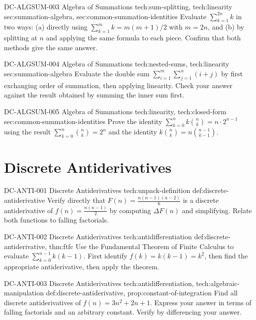 \exstubgenfull
  {DC-ALGSUM-003}
  {Algebra of Summations}
  {tech:sum-splitting, tech:linearity}
  {sec:summation-algebra, sec:common-summation-identities}
  {Evaluate \(\displaystyle\sum_{k=1}^{2n} k\) in two ways:
  (a) directly using \(\sum_{k=1}^{m}k = m(m+1)/2\) with \(m = 2n\), and
  (b) by splitting at \(n\) and applying the same formula to each piece.
  Confirm that both methods give the same answer.}

\exstubgenfull
  {DC-ALGSUM-004}
  {Algebra of Summations}
  {tech:nested-sums, tech:linearity}
  {sec:summation-algebra}
  {Evaluate the double sum
  \(\displaystyle\sum_{i=1}^{m}\sum_{j=1}^{n}(i+j)\)
  by first exchanging order of summation, then applying linearity.
  Check your answer against the result obtained by summing
  the inner sum first.}

\exstubgenfull
  {DC-ALGSUM-005}
  {Algebra of Summations}
  {tech:linearity, tech:closed-form}
  {sec:common-summation-identities}
  {Prove the identity
  \(\displaystyle\sum_{k=0}^{n} k\binom{n}{k} = n\cdot 2^{n-1}\)
  using the result \(\displaystyle\sum_{k=0}^{n}\binom{n}{k} = 2^n\)
  and the identity \(k\binom{n}{k} = n\binom{n-1}{k-1}\).}

\section*{Discrete Antiderivatives}

\exstubgenfull
  {DC-ANTI-001}
  {Discrete Antiderivatives}
  {tech:unpack-definition}
  {def:discrete-antiderivative}
  {Verify directly that \(F(n) = \frac{n(n-1)(n-2)}{6}\) is a discrete
  antiderivative of \(f(n) = \frac{n(n-1)}{2}\) by computing \(\Delta F(n)\)
  and simplifying. Relate both functions to falling factorials.}

\exstubgenfull
  {DC-ANTI-002}
  {Discrete Antiderivatives}
  {tech:antidifferentiation}
  {def:discrete-antiderivative, thm:ftfc}
  {Use the Fundamental Theorem of Finite Calculus to evaluate
  \(\displaystyle\sum_{k=0}^{n-1} k(k-1)\).
  First identify \(f(k) = k(k-1) = k^{\underline{2}}\), then find the
  appropriate antiderivative, then apply the theorem.}

\exstubgenfull
  {DC-ANTI-003}
  {Discrete Antiderivatives}
  {tech:antidifferentiation, tech:algebraic-manipulation}
  {def:discrete-antiderivative, prop:constant-of-integration}
  {Find all discrete antiderivatives of \(f(n) = 3n^{\underline{2}} + 2n + 1\).
  Express your answer in terms of falling factorials and an arbitrary
  constant. Verify by differencing your answer.}

